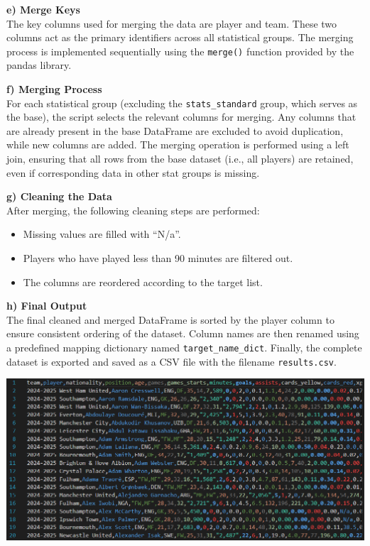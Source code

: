 \documentclass[a4paper,12pt]{article}
\begin{document}
\vspace{1em}
\textbf{e) Merge Keys} \\
The key columns used for merging the data are player and team. These two columns act as the primary identifiers across all statistical groups. The merging process is implemented sequentially using the \texttt{merge()} function provided by the pandas library.

\vspace{1em}
\textbf{f) Merging Process} \\
For each statistical group (excluding the \texttt{stats\_standard} group, which serves as the base), the script selects the relevant columns for merging. Any columns that are already present in the base DataFrame are excluded to avoid duplication, while new columns are added. The merging operation is performed using a left join, ensuring that all rows from the base dataset (i.e., all players) are retained, even if corresponding data in other stat groups is missing.

\vspace{1em}
\textbf{g) Cleaning the Data} \\
After merging, the following cleaning steps are performed:
\begin{itemize}
    \item Missing values are filled with “N/a”.
    \item Players who have played less than 90 minutes are filtered out.
    \item The columns are reordered according to the target list.
\end{itemize}

\vspace{1em}
\textbf{h) Final Output} \\
The final cleaned and merged DataFrame is sorted by the player column to ensure consistent ordering of the dataset. Column names are then renamed using a predefined mapping dictionary named \texttt{target\_name\_dict}. Finally, the complete dataset is exported and saved as a CSV file with the filename \texttt{results.csv}.

\includegraphics[width=1\textwidth]{results.PNG}
\end{document}
